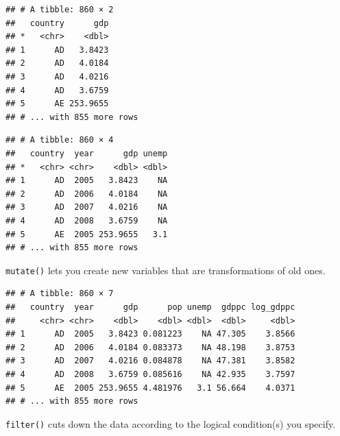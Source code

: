 \documentclass[12pt,oneside,openany]{book}
\newenvironment{Shaded}{\begin{snugshade}}{\end{snugshade}}
\newcommand{\KeywordTok}[1]{\textcolor[rgb]{0.13,0.29,0.53}{\textbf{#1}}}
\newcommand{\DataTypeTok}[1]{\textcolor[rgb]{0.13,0.29,0.53}{#1}}
\newcommand{\DecValTok}[1]{\textcolor[rgb]{0.00,0.00,0.81}{#1}}
\newcommand{\StringTok}[1]{\textcolor[rgb]{0.31,0.60,0.02}{#1}}
\newcommand{\OperatorTok}[1]{\textcolor[rgb]{0.81,0.36,0.00}{\textbf{#1}}}
\newcommand{\NormalTok}[1]{#1}
\begin{document}
\begin{verbatim}
## # A tibble: 860 × 2
##   country      gdp
## *   <chr>    <dbl>
## 1      AD   3.8423
## 2      AD   4.0184
## 3      AD   4.0216
## 4      AD   3.6759
## 5      AE 253.9655
## # ... with 855 more rows
\end{verbatim}

\begin{Shaded}
\end{Shaded}

\begin{verbatim}
## # A tibble: 860 × 4
##   country  year      gdp unemp
## *   <chr> <chr>    <dbl> <dbl>
## 1      AD  2005   3.8423    NA
## 2      AD  2006   4.0184    NA
## 3      AD  2007   4.0216    NA
## 4      AD  2008   3.6759    NA
## 5      AE  2005 253.9655   3.1
## # ... with 855 more rows
\end{verbatim}

\texttt{mutate()} lets you create new variables that are transformations
of old ones.

\begin{Shaded}
\end{Shaded}

\begin{verbatim}
## # A tibble: 860 × 7
##   country  year      gdp      pop unemp  gdppc log_gdppc
##     <chr> <chr>    <dbl>    <dbl> <dbl>  <dbl>     <dbl>
## 1      AD  2005   3.8423 0.081223    NA 47.305    3.8566
## 2      AD  2006   4.0184 0.083373    NA 48.198    3.8753
## 3      AD  2007   4.0216 0.084878    NA 47.381    3.8582
## 4      AD  2008   3.6759 0.085616    NA 42.935    3.7597
## 5      AE  2005 253.9655 4.481976   3.1 56.664    4.0371
## # ... with 855 more rows
\end{verbatim}

\texttt{filter()} cuts down the data according to the logical
condition(s) you specify.

\begin{Shaded}
\end{Shaded}
\end{document}
